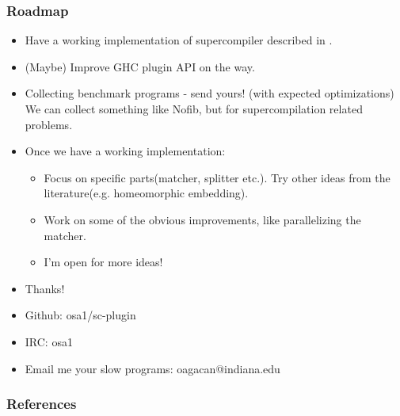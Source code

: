 \documentclass{beamer}
\begin{document}
\begin{frame}
    \frametitle{Roadmap}

    \begin{itemize}[<+->]
        \item[]
            Have a working implementation of supercompiler described in
            \citet{callbyneed-sc}.
        \item[]
            (Maybe) Improve GHC plugin API on the way.
        \item[]
            Collecting benchmark programs - send yours! (with expected
            optimizations)
            \newline
            We can collect something like Nofib, but for supercompilation
            related problems.
        \item[]
            Once we have a working implementation:
            \begin{itemize}
                \item
                    Focus on specific parts(matcher, splitter etc.). Try other
                    ideas from the literature(e.g. homeomorphic embedding).
                \item
                    Work on some of the obvious improvements, like parallelizing
                    the matcher.
                \item
                    I'm open for more ideas!
            \end{itemize}
    \end{itemize}
\end{frame}

\begin{frame}
    \centering
    \begin{itemize}
        \itemsep1em

        \item[]
            \begin{huge}
                Thanks!
            \end{huge}

        \item[]
            Github: osa1/sc-plugin

        \item[]
            IRC: osa1

        \item[]
            Email me your slow programs: oagacan@indiana.edu

    \end{itemize}
\end{frame}

\begin{frame}[allowframebreaks]
    \frametitle{References}

    
    
\end{frame}
\end{document}
